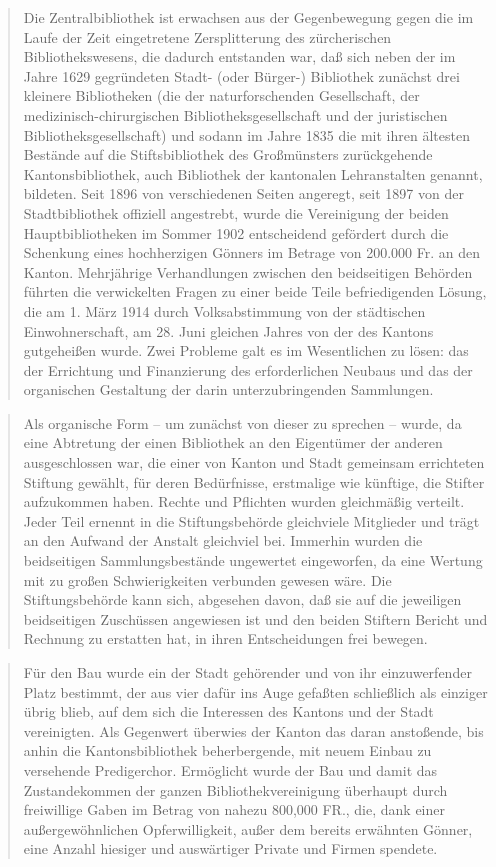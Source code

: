 \documentclass[a4paper,
fontsize=11pt,
oneside,
numbers=noperiodatend,
parskip=half-,
bibliography=totoc,
final
]{scrartcl}
\begin{document}
\begin{quote}
Die Zentralbibliothek ist erwachsen aus der Gegenbewegung gegen die im
Laufe der Zeit eingetretene Zersplitterung des zürcherischen
Bibliothekswesens, die dadurch entstanden war, daß sich neben der im
Jahre 1629 gegründeten Stadt- (oder Bürger-) Bibliothek zunächst drei
kleinere Bibliotheken (die der naturforschenden Gesellschaft, der
medizinisch-chirurgischen Bibliotheksgesellschaft und der juristischen
Bibliotheksgesellschaft) und sodann im Jahre 1835 die mit ihren ältesten
Bestände auf die Stiftsbibliothek des Großmünsters zurückgehende
Kantonsbibliothek, auch Bibliothek der kantonalen Lehranstalten genannt,
bildeten. Seit 1896 von verschiedenen Seiten angeregt, seit 1897 von der
Stadtbibliothek offiziell angestrebt, wurde die Vereinigung der beiden
Hauptbibliotheken im Sommer 1902 entscheidend gefördert durch die
Schenkung eines hochherzigen Gönners im Betrage von 200.000 Fr. an den
Kanton. Mehrjährige Verhandlungen zwischen den beidseitigen Behörden
führten die verwickelten Fragen zu einer beide Teile befriedigenden
Lösung, die am 1. März 1914 durch Volksabstimmung von der städtischen
Einwohnerschaft, am 28. Juni gleichen Jahres von der des Kantons
gutgeheißen wurde. Zwei Probleme galt es im Wesentlichen zu lösen: das
der Errichtung und Finanzierung des erforderlichen Neubaus und das der
organischen Gestaltung der darin unterzubringenden Sammlungen.
\end{quote}

\begin{quote}
Als organische Form -- um zunächst von dieser zu sprechen -- wurde, da
eine Abtretung der einen Bibliothek an den Eigentümer der anderen
ausgeschlossen war, die einer von Kanton und Stadt gemeinsam errichteten
Stiftung gewählt, für deren Bedürfnisse, erstmalige wie künftige, die
Stifter aufzukommen haben. Rechte und Pflichten wurden gleichmäßig
verteilt. Jeder Teil ernennt in die Stiftungsbehörde gleichviele
Mitglieder und trägt an den Aufwand der Anstalt gleichviel bei. Immerhin
wurden die beidseitigen Sammlungsbestände ungewertet eingeworfen, da
eine Wertung mit zu großen Schwierigkeiten verbunden gewesen wäre. Die
Stiftungsbehörde kann sich, abgesehen davon, daß sie auf die jeweiligen
beidseitigen Zuschüssen angewiesen ist und den beiden Stiftern Bericht
und Rechnung zu erstatten hat, in ihren Entscheidungen frei bewegen.
\end{quote}

\begin{quote}
Für den Bau wurde ein der Stadt gehörender und von ihr einzuwerfender
Platz bestimmt, der aus vier dafür ins Auge gefaßten schließlich als
einziger übrig blieb, auf dem sich die Interessen des Kantons und der
Stadt vereinigten. Als Gegenwert überwies der Kanton das daran
anstoßende, bis anhin die Kantonsbibliothek beherbergende, mit neuem
Einbau zu versehende Predigerchor. Ermöglicht wurde der Bau und damit
das Zustandekommen der ganzen Bibliothekvereinigung überhaupt durch
freiwillige Gaben im Betrag von nahezu 800,000 FR., die, dank einer
außergewöhnlichen Opferwilligkeit, außer dem bereits erwähnten Gönner,
eine Anzahl hiesiger und auswärtiger Private und Firmen spendete.
\end{quote}
\end{document}
